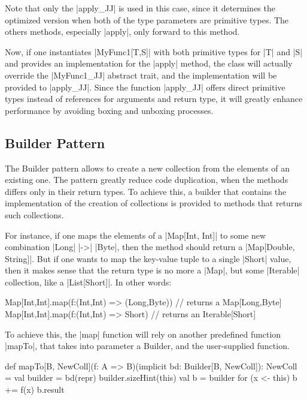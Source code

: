 Note that only the |apply_JJ| is used in this case, since it determines the optimized version when both of the type parameters are primitive types. The others methods, especially |apply|, only forward to this method.

Now, if one instantiates |MyFunc1[T,S]| with both primitive types for |T| and |S| and provides an implementation for the |apply| method, the class will actually override the |MyFunc1_JJ| abstract trait, and the implementation will be provided to |apply_JJ|. Since the function |apply_JJ| offers direct primitive types instead of references for arguments and return type, it will greatly enhance performance by avoiding boxing and unboxing processes.

\subsection{Builder Pattern}

The Builder pattern allows to create a new collection from the elements of an existing one. The pattern greatly reduce code duplication, when the methods differs only in their return types. To achieve this, a builder that contains the implementation of the creation of collections is provided to methods that returns such collections.


For instance, if one maps the elements of a |Map[Int, Int]| to some new combination |Long| |->| |Byte|, then the method should return a |Map[Double, String]|. But if one wants to map the key-value tuple to a single |Short| value, then it makes sense that the return type is no more a |Map|, but some |Iterable| collection, like a |List[Short]|. In other words:

\begin{lstlisting-nobreak}
 Map[Int,Int].map(f:(Int,Int) => (Long,Byte))
      // returns a Map[Long,Byte]
 Map[Int,Int].map(f:(Int,Int) => Short)
      // returns an Iterable[Short]
\end{lstlisting-nobreak}

To achieve this, the |map| function will rely on another predefined function |mapTo|, that takes into parameter a Builder, and the user-supplied function.

\begin{lstlisting-nobreak}
 def mapTo[B, NewColl](f: A => B)(implicit bd: Builder[B, NewColl]): NewColl = {
   val builder = bd(repr)
   builder.sizeHint(this)
   val b = builder
   for (x <- this) b += f(x)
   b.result
 }
\end{lstlisting-nobreak}



